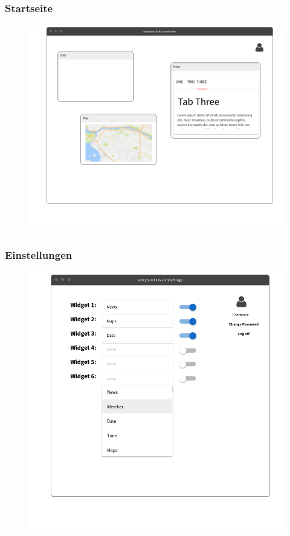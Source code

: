 		\subsubsection{Startseite}
			\begin{figure}[H]
				\includegraphics[scale=0.4]{images/p2}
			\end{figure}
		
		\subsubsection{Einstellungen}
			\begin{figure}[H]
				\includegraphics[scale=0.4]{images/p3}
			\end{figure}
		
